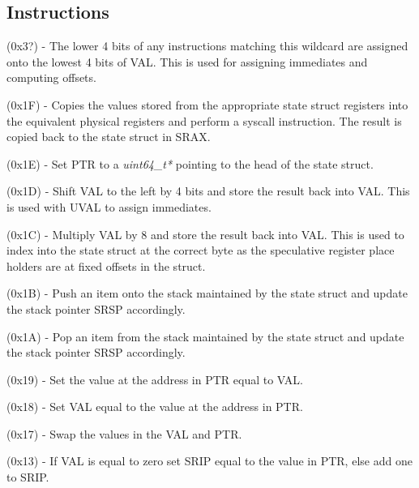 \subsection{Instructions}
\begin{description}
  \setlength\itemsep{1em}
  \setlength{}
\item[UVAL] (0x3?) - 
The lower 4 bits of any instructions matching this wildcard are 
assigned onto the lowest 4 bits of VAL. This is used
for assigning immediates and computing offsets.
  
\item[SYSCALL] (0x1F) - 
Copies the values stored from the appropriate state struct registers 
into the equivalent physical registers and perform a syscall instruction. 
The result is copied back to the state struct in SRAX.

\item[BASE] (0x1E) - 
Set PTR to a \textit{uint64\_t*} pointing to the head of the state struct.  

\item[SHVAL] (0x1D) - 
Shift VAL to the left by 4 bits and store the result back into VAL. This is
used with UVAL to assign immediates.

\item[MREG] (0x1C) - 
Multiply VAL by 8 and store the result back into VAL. This is used to index 
into the state struct at the correct byte as the speculative register place
holders are at fixed offsets in the struct.

\item[PUSH] (0x1B) -
Push an item onto the stack maintained by the state struct and update the 
stack pointer SRSP accordingly. 
 
\item[POP] (0x1A) - 
Pop an item from the stack maintained by the state struct and update the 
stack pointer SRSP accordingly. 

\item[APTR] (0x19) - 
Set the value at the address in PTR equal to VAL.

\item[DPTR] (0x18) - 
Set VAL equal to the value at the address in PTR. 

\item[SWAP] (0x17) - 
Swap the values in the VAL and PTR.

\item[JZ] (0x13) - 
If VAL is equal to zero set SRIP equal to the value in PTR, else add one to SRIP.


\end{description}
